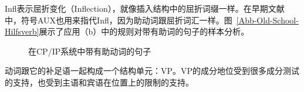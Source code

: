 Infl表示屈折变化（Inflection），就像插入结构中的屈折词缀一样。在早期文献中，符号AUX也用来指代Infl，因为助动词跟屈折词汇一样。图~\vref{Abb-Old-School-Hilfsverb}展示了应用（b）中的规则对带有助词的句子的样本分析。
%
\begin{figure}
\begin{floatrow}
{\caption{\label{Abb-GB-Hilfsverb}在CP/IP系统中带有助动词的句子}}
\end{floatrow}
\end{figure}%

动词跟它的补足语一起构成一个结构单元：VP。VP的成分地位受到很多成分测试的支持，也受到主语和宾语在位置上的限制的支持。

